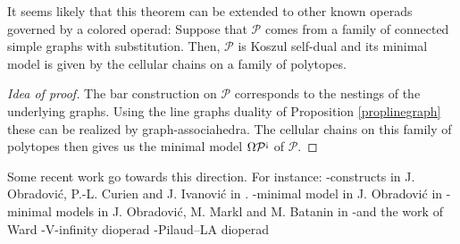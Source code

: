 It seems likely that this theorem can be extended to other known operads governed by a colored operad: Suppose that $\mathcal{P}$ comes from a family of connected simple graphs with substitution. Then, $\mathcal{P}$ is Koszul self-dual and its minimal model is given by the cellular chains on a family of polytopes. 
\begin{proof}[Idea of proof] The bar construction on $\mathcal{P}$ corresponds to the nestings of the underlying graphs. Using the line graphs duality of Proposition \ref{proplinegraph} these can be realized by graph-associahedra. The cellular chains on this family of polytopes then gives us the minimal model $\Omega \mathcal{P}^{{\scriptstyle \text{\rm !`}}}$ of $\mathcal{P}$.
\end{proof} 
Some recent work go towards this direction. For instance: 
-constructs in J. Obradovi\'c, P.-L. Curien and J. Ivanovi\'c in \cite{CIO18}.
-minimal model in  J. Obradovi\'c in \cite{Obradovic19} 
-minimal models in  J. Obradovi\'c, M. Markl and M. Batanin in \cite{BMO20}
-and the work of Ward
-V-infinity dioperad
-Pilaud--LA dioperad




